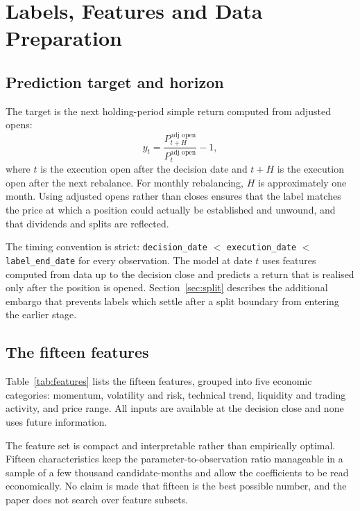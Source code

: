\documentclass[11pt,a4paper]{article}
\begin{document}
\section{Labels, Features and Data Preparation}
\label{sec:data}

\subsection{Prediction target and horizon}

The target is the next holding-period simple return computed from adjusted opens:
\begin{equation}
y_t=\frac{P^{\text{adj open}}_{t+H}}{P^{\text{adj open}}_{t}}-1,
\label{eq:target}
\end{equation}
where $t$ is the execution open after the decision date and $t+H$ is the execution open after the next rebalance. For monthly rebalancing, $H$ is approximately one month. Using adjusted opens rather than closes ensures that the label matches the price at which a position could actually be established and unwound, and that dividends and splits are reflected.

The timing convention is strict: \texttt{decision\_date} $<$ \texttt{execution\_date} $<$ \texttt{label\_end\_date} for every observation. The model at date $t$ uses features computed from data up to the decision close and predicts a return that is realised only after the position is opened. Section~\ref{sec:split} describes the additional embargo that prevents labels which settle after a split boundary from entering the earlier stage.

\subsection{The fifteen features}

Table~\ref{tab:features} lists the fifteen features, grouped into five economic categories: momentum, volatility and risk, technical trend, liquidity and trading activity, and price range. All inputs are available at the decision close and none uses future information.



The feature set is compact and interpretable rather than empirically optimal. Fifteen characteristics keep the parameter-to-observation ratio manageable in a sample of a few thousand candidate-months and allow the coefficients to be read economically. No claim is made that fifteen is the best possible number, and the paper does not search over feature subsets.
\end{document}
